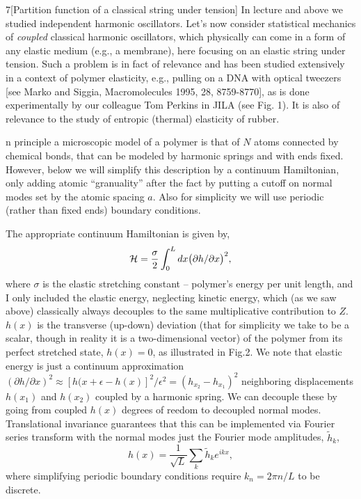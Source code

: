 \documentclass[12pt]{article}
\begin{document}
\begin{problem}{7}[Partition function of a classical string under tension]
In lecture and above we studied independent harmonic oscillators. Let's now
consider statistical mechanics of \textit{coupled} classical harmonic
oscillators, which physically can come in a form of any elastic medium (e.g., a
membrane), here focusing on an elastic string under tension. Such a problem is
in fact of relevance and has been studied extensively in a context of polymer
elasticity, e.g., pulling on a DNA with optical tweezers [see Marko and Siggia,
Macromolecules 1995, 28, 8759-8770], as is done experimentally by our colleague
Tom Perkins in JILA (see Fig. 1). It is also of relevance to the study of
entropic (thermal) elasticity of rubber.

n principle a microscopic model of a polymer is that of $N$ atoms connected by 
chemical bonds, that can be modeled by harmonic springs and with ends fixed. 
However, below we will simplify this description by a continuum Hamiltonian, 
only adding atomic “granuality” after the fact by putting a cutoff on normal 
modes set by the atomic spacing $a$. Also for simplicity we will use periodic 
(rather than fixed ends) boundary conditions.

The appropriate continuum Hamiltonian is given by,
\begin{equation}
    \mathcal{H}=\frac\sigma2\int_0^Ldx\qty(\partial h/\partial x)^2,
\end{equation}
where $\sigma$ is the elastic stretching constant -- polymer's energy per unit
length, and I only included the elastic energy, neglecting kinetic energy, 
which (as we saw above) classically always decouples to the same 
multiplicative contribution to $Z$. $h(x)$ is the transverse (up-down) 
deviation (that for simplicity we take to be a scalar, though in
reality it is a two-dimensional vector) of the polymer from its perfect 
stretched state, $h(x) = 0$, as illustrated in Fig.2.
We note that elastic energy is just a continuum approximation
$(\partial h/\partial x)^2 \approx [h(x + \epsilon -h(x)]^2/\epsilon^2 =
(h_{x_2} -h_{x_1})^2$ neighboring displacements $h(x_1)$ and $h(x_2)$ coupled 
by a harmonic spring. We can decouple these by going from coupled $h(x)$ 
degrees of reedom to decoupled normal modes. Translational invariance 
guarantees that this can be implemented via Fourier series transform with the 
normal modes just the Fourier mode amplitudes, $\tilde{h}_k$,
\begin{equation}\label{p7:Fh}
    h(x)=\frac1{\sqrt{L}}\sum_k\tilde{h}_ke^{ikx}, 
\end{equation}
where simplifying periodic boundary conditions require $k_n=2\pi n/L$ to be
discrete.


\end{problem}
\end{document}
